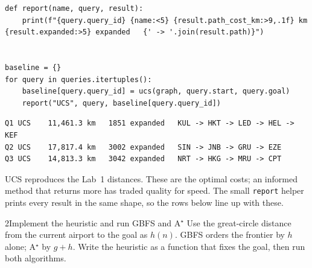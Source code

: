 \begin{labanswer}
\begin{lstlisting}[style=utppython]
def report(name, query, result):
    print(f"{query.query_id} {name:<5} {result.path_cost_km:>9,.1f} km  {result.expanded:>5} expanded   {' -> '.join(result.path)}")


baseline = {}
for query in queries.itertuples():
    baseline[query.query_id] = ucs(graph, query.start, query.goal)
    report("UCS", query, baseline[query.query_id])
\end{lstlisting}
\expectedoutput
\begin{lstlisting}[style=utpterminal]
Q1 UCS    11,461.3 km   1851 expanded   KUL -> HKT -> LED -> HEL -> KEF
Q2 UCS    17,817.4 km   3002 expanded   SIN -> JNB -> GRU -> EZE
Q3 UCS    14,813.3 km   3042 expanded   NRT -> HKG -> MRU -> CPT
\end{lstlisting}
UCS reproduces the Lab~1 distances. These are the optimal costs; an informed method that returns more has traded quality for speed. The small \texttt{report} helper prints every result in the same shape, so the rows below line up with these.
\end{labanswer}

\begin{labquestion}{2}{Implement the heuristic and run GBFS and A$^\star$}
Use the great-circle distance from the current airport to the goal as $h(n)$. GBFS orders the frontier by $h$ alone; A$^\star$ by $g+h$. Write the heuristic as a function that fixes the goal, then run both algorithms.
\end{labquestion}

